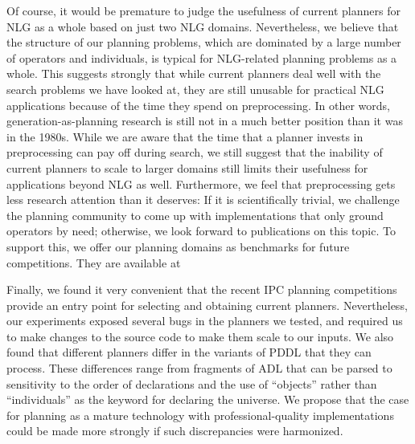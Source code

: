 Of course, it would be premature to judge the usefulness of current
planners for NLG as a whole based on just two NLG
domains. Nevertheless, we believe that the structure of our planning
problems, which are dominated by a large number of operators and
individuals, is typical for NLG-related planning problems as a
whole. This suggests strongly that while current planners deal well
with the search problems we have looked at, they are still unusable
for practical NLG applications because of the time they spend on
preprocessing. In other words, generation-as-planning research is
still not in a much better position than it was in the 1980s. While we
are aware that the time that a planner invests in preprocessing can
pay off during search, we still suggest that the inability of current
planners to scale to larger domains still limits their usefulness for
applications beyond NLG as well. Furthermore, we feel that
preprocessing gets less research attention than it deserves: If it is
scientifically trivial, we challenge the planning community to come up
with implementations that only ground operators by need; otherwise, we
look forward to publications on this topic. To support this, we offer
our planning domains as benchmarks for future competitions. They are
available at 

Finally, we found it very convenient that the recent IPC planning
competitions provide an entry point for selecting and obtaining
current planners. Nevertheless, our experiments exposed several bugs
in the planners we tested, and required us to make changes to the
source code to make them scale to our inputs. We also found that
different planners differ in the variants of PDDL that they can
process. These differences range from fragments of ADL that can be
parsed to sensitivity to the order of declarations and the use of
``objects'' rather than ``individuals'' as the keyword for declaring
the universe. We propose that the case for planning as a mature
technology with professional-quality implementations could be made
more strongly if such discrepancies were harmonized.



